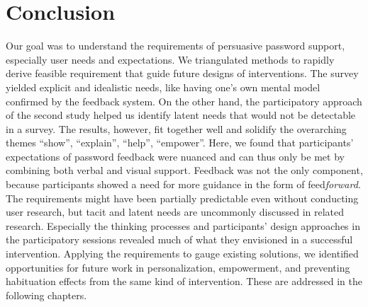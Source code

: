 \section{Conclusion}
Our goal was to understand the requirements of persuasive password support, especially user needs and expectations. 
We triangulated methods to rapidly derive feasible requirement that guide future designs of interventions. 
The survey yielded explicit and idealistic needs, like having one's own mental model confirmed by the feedback system. On the other hand, the participatory approach of the second study helped us identify latent needs that would not be detectable in a survey. The results, however, fit together well and solidify the overarching themes ``show'', ``explain'', ``help'', ``empower''. 
Here, we found that participants' expectations of password feedback were nuanced and can thus only be met by combining both verbal and visual support. Feedback was not the only component, because participants showed a need for more guidance in the form of feed\textit{forward}.
The requirements might have been partially predictable even without conducting user research, but tacit and latent needs are uncommonly discussed in related research. Especially the thinking processes and participants' design approaches in the participatory sessions revealed much of what they envisioned in a successful intervention.
Applying the requirements to gauge existing solutions, we identified opportunities for future work in personalization, empowerment, and preventing habituation effects from the same kind of intervention. These are addressed in the following chapters. 


